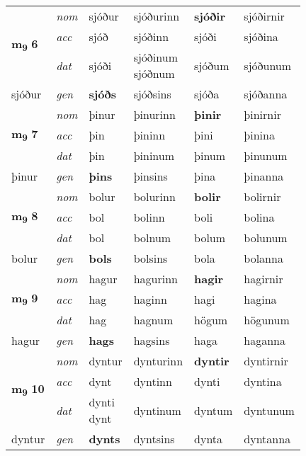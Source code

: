 \begin{longtable}[l]{X>{\footnotesize\itshape}XXXXX}
\multirow{3}{*}{{{\textbf{m{\textsubscript{9}}} \Large{\textbf{6}}}}}  
 & nom & sjóður & sjóðurinn    & \textbf{sjóðir} & sjóðirnir  \\*
 & acc & sjóð  & sjóðinn   & sjóði  & sjóðina \\*
 & dat & sjóði & \specialcell{sjóðinum\\ sjóðnum}   & sjóðum & sjóðunum \\*
 {\footnotesize{sjóður}} &  gen & \textbf{sjóðs}  & sjóðsins  & sjóða & sjóðanna \\
\cmidrule{1-6}


\multirow{3}{*}{{{\textbf{m{\textsubscript{9}}} \Large{\textbf{7}}}}}  
 & nom & þinur & þinurinn    & \textbf{þinir} & þinirnir  \\*
 & acc & þin  & þininn   & þini  & þinina \\*
 & dat & þin & þininum   & þinum & þinunum \\*
 {\footnotesize{þinur}} &  gen & \textbf{þins}  & þinsins  & þina & þinanna \\
\cmidrule{1-6}


\multirow{3}{*}{{{\textbf{m{\textsubscript{9}}} \Large{\textbf{8}}}}}  
 & nom & bolur & bolurinn    & \textbf{bolir} & bolirnir  \\*
 & acc & bol  & bolinn   & boli  & bolina \\*
 & dat & bol & bolnum   & bolum & bolunum \\*
 {\footnotesize{bolur}} &  gen & \textbf{bols}  & bolsins  & bola & bolanna \\
\cmidrule{1-6}


\multirow{3}{*}{{{\textbf{m{\textsubscript{9}}} \Large{\textbf{9}}}}}  
 & nom & hagur & hagurinn    & \textbf{hagir} & hagirnir  \\*
 & acc & hag  & haginn   & hagi  & hagina \\*
 & dat & hag & hagnum   & högum & högunum \\*
 {\footnotesize{hagur}} &  gen & \textbf{hags}  & hagsins  & haga & haganna \\
\cmidrule{1-6}


\multirow{3}{*}{{{\textbf{m{\textsubscript{9}}} \Large{\textbf{10}}}}}  
 & nom & dyntur & dynturinn    & \textbf{dyntir} & dyntirnir  \\*
 & acc & dynt  & dyntinn   & dynti  & dyntina \\*
 & dat & \specialcell{dynti\\ dynt} & dyntinum   & dyntum & dyntunum \\*
 {\footnotesize{dyntur}} &  gen & \textbf{dynts}  & dyntsins  & dynta & dyntanna \\
\cmidrule{1-6}



\end{longtable}
